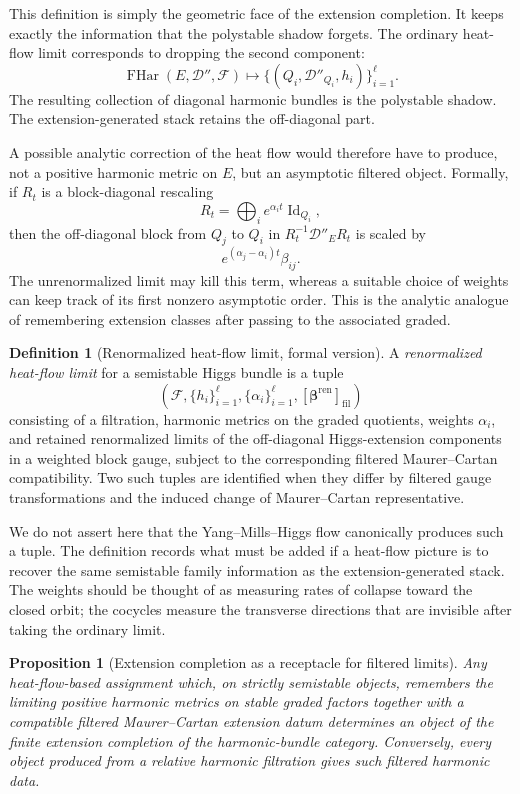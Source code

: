 \documentclass[11pt,reqno]{amsart}
\newtheorem{proposition}[theorem]{Proposition}
\theoremstyle{definition}
\newtheorem{definition}[theorem]{Definition}
\theoremstyle{remark}
\newcommand{\cD}{\mathcal D}
\newcommand{\Id}{\operatorname{Id}}
\begin{document}
This definition is simply the geometric face of the extension completion.  It keeps exactly the information that the polystable shadow forgets.  The ordinary heat-flow limit corresponds to dropping the second component:
\[
  \operatorname{FHar}(E,\cD'',\mathcal F)
  \longmapsto
  \{(Q_i,\cD''_{Q_i},h_i)\}_{i=1}^\ell.
\]
The resulting collection of diagonal harmonic bundles is the polystable shadow.  The extension-generated stack retains the off-diagonal part.

A possible analytic correction of the heat flow would therefore have to produce, not a positive harmonic metric on $E$, but an asymptotic filtered object.  Formally, if $R_t$ is a block-diagonal rescaling
\[
  R_t=\bigoplus_i e^{\alpha_i t}\Id_{Q_i},
\]
then the off-diagonal block from $Q_j$ to $Q_i$ in $R_t^{-1}\cD''_E R_t$ is scaled by
\[
  e^{(\alpha_j-\alpha_i)t}\beta_{ij}.
\]
The unrenormalized limit may kill this term, whereas a suitable choice of weights can keep track of its first nonzero asymptotic order.  This is the analytic analogue of remembering extension classes after passing to the associated graded.

\begin{definition}[Renormalized heat-flow limit, formal version]\label{def:renormalized-heat-limit}
A \emph{renormalized heat-flow limit} for a semistable Higgs bundle is a tuple
\[
  \left(\mathcal F,\{h_i\}_{i=1}^\ell,\{\alpha_i\}_{i=1}^\ell,
  [\boldsymbol\beta^{\mathrm{ren}}]_{\mathrm{fil}}\right)
\]
consisting of a filtration, harmonic metrics on the graded quotients,
weights $\alpha_i$, and retained renormalized limits of the
off-diagonal Higgs-extension components in a weighted block gauge,
subject to the corresponding filtered Maurer--Cartan compatibility.
Two such tuples are identified when they differ by filtered gauge
transformations and the induced change of Maurer--Cartan representative.
\end{definition}

We do not assert here that the Yang--Mills--Higgs flow canonically produces such a tuple.  The definition records what must be added if a heat-flow picture is to recover the same semistable family information as the extension-generated stack.  The weights should be thought of as measuring rates of collapse toward the closed orbit; the cocycles measure the transverse directions that are invisible after taking the ordinary limit.

\begin{proposition}[Extension completion as a receptacle for filtered limits]\label{prop:extension-completion-receptacle}
Any heat-flow-based assignment which, on strictly semistable objects,
remembers the limiting positive harmonic metrics on stable graded
factors together with a compatible filtered Maurer--Cartan extension
datum determines an object of the finite extension completion of the
harmonic-bundle category.  Conversely, every object produced from a
relative harmonic filtration gives such filtered harmonic data.
\end{proposition}
\end{document}
